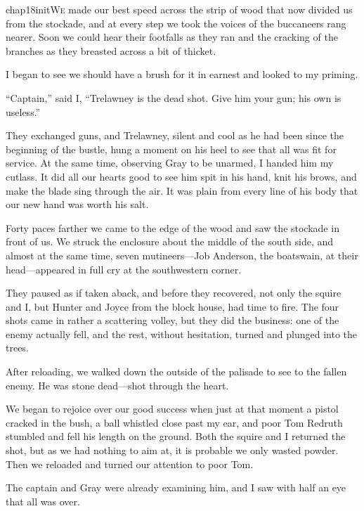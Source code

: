  
   \lettrine[lines=4,image=true]{chap18initW}{e} made our best speed across the strip of wood that now divided us from the stockade, and at every step we took the voices of the buccaneers rang nearer. Soon we could hear their footfalls as they ran and the cracking of the branches as they breasted across a bit of thicket.

I began to see we should have a brush for it in earnest and looked to my priming.

\enquote{Captain,} said I, \enquote{Trelawney is the dead shot. Give him your gun; his own is useless.}

They exchanged guns, and Trelawney, silent and cool as he had been since the beginning of the bustle, hung a moment on his heel to see that all was fit for service. At the same time, observing Gray to be unarmed, I handed him my cutlass. It did all our hearts good to see him spit in his hand, knit his brows, and make the blade sing through the air. It was plain from every line of his body that our new hand was worth his salt.

Forty paces farther we came to the edge of the wood and saw the stockade in front of us. We struck the enclosure about the middle of the south side, and almost at the same time, seven mutineers---Job Anderson, the boatswain, at their head---appeared in full cry at the southwestern corner.

They paused as if taken aback, and before they recovered, not only the squire and I, but Hunter and Joyce from the block house, had time to fire. The four shots came in rather a scattering volley, but they did the business: one of the enemy actually fell, and the rest, without hesitation, turned and plunged into the trees.

After reloading, we walked down the outside of the palisade to see to the fallen enemy. He was stone dead---shot through the heart.

We began to rejoice over our good success when just at that moment a pistol cracked in the bush, a ball whistled close past my ear, and poor Tom Redruth stumbled and fell his length on the ground. Both the squire and I returned the shot, but as we had nothing to aim at, it is probable we only wasted powder. Then we reloaded and turned our attention to poor Tom.

The captain and Gray were already examining him, and I saw with half an eye that all was over.

